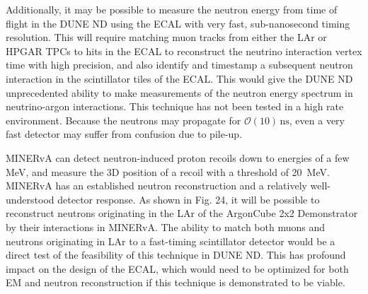 Additionally, it may be possible to measure the neutron energy from time of flight in the DUNE ND using the ECAL with very fast, sub-nanosecond timing resolution. This will require matching muon tracks from either the LAr or HPGAR TPCs to hits in the ECAL to reconstruct the neutrino interaction vertex time with high precision, and also identify and timestamp a subsequent neutron interaction in the scintillator tiles of the ECAL. This would give the DUNE ND unprecedented ability to make measurements of the neutron energy spectrum in neutrino-argon interactions. This technique has not been tested in a high rate environment. Because the neutrons may propagate for $\mathcal{O}\left(10\right)\,\mathrm{ns}$, even a very fast detector may suffer from confusion due to pile-up.

MINERvA can detect neutron-induced proton recoils down to energies of a few MeV, and measure the 3D position of a recoil with a threshold of 20~MeV.  MINERvA has an established neutron reconstruction and a relatively well-understood detector response.  As shown in Fig. 24, it will be possible to reconstruct neutrons originating in the LAr of the ArgonCube 2x2 Demonstrator by their interactions in MINERvA. The ability to match both muons and neutrons originating in LAr to a fast-timing scintillator detector would be a direct test of the feasibility of this technique in DUNE ND. This has profound impact on the design of the ECAL, which would need to be optimized for both EM and neutron reconstruction if this technique is demonstrated to be viable. 
 
 
\FloatBarrier
